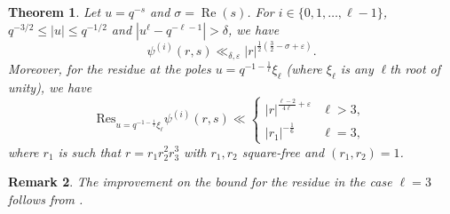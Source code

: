 \documentclass[12pt]{amsart}
\newtheorem{theorem}{Theorem}[section]
\newtheorem{remark}[theorem]{Remark}
\DeclareMathOperator{\re}{Re}
\begin{document}
\begin{theorem}
\label{residue}
Let $u=q^{-s}$ and $\sigma=\re(s)$. For $i \in \{0,1,\ldots,\ell-1\}$, $q^{-3/2} \leq |u| \leq q^{-1/2}$ and $|u^\ell-q^{-\ell-1}|>\delta$, we have
$$\psi^{(i)}(r,s) \ll_{\delta,\varepsilon} |r|^{\frac12 \left( \frac{3}{2} - \sigma+ \varepsilon \right)}.$$
Moreover, for the residue at the poles  $u = q^{-1-\frac{1}{\ell}} \xi_{\ell}$ (where $\xi_\ell$ is any $\ell$th root of unity), we have
$$
\mathrm{Res}_{u=q^{-1-\frac{1}{\ell}} \xi_{\ell}
}\psi^{(i)}(r,s) \ll \begin{cases}|r|^{\frac{\ell-2}{4\ell} + \varepsilon} & \ell>3,\\
  |r_1|^{-\frac{1}{6}} & \ell=3,
                                       \end{cases}
$$
where $r_1$ is such that $r=r_1r_2^2r_3^3$ with $r_1,r_2$ square-free and $(r_1,r_2)=1$.
\end{theorem}
\begin{remark}
 The improvement on the bound for the residue in the case $\ell=3$ follows from \cite[Lemma 3.9]{DFL}.
\end{remark}
\end{document}

